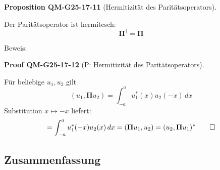 \documentclass[10pt, letterpaper]{article}
\newcommand{\CustomHeading}[3]{%
  \par\medskip\noindent%
  \textbf{#1 #2} \textnormal{(#3)}.\enskip%
}
\newenvironment{PROP}[2]{\begin{unitbox}\CustomHeading{Proposition}{#1}{#2}}{\end{unitbox}}
\newenvironment{PROOF}[2]{\begin{unitbox}\CustomHeading{Proof}{#1}{#2}}{\end{unitbox}}
\begin{document}
\begin{PROP}{QM-G25-17-11}{Hermitizität des Paritätsoperators}
Der Paritätsoperator ist hermitesch:
\[
\boldsymbol{\Pi}^\dagger = \boldsymbol{\Pi}
\]
\end{PROP}


Beweis: 

\begin{PROOF}{QM-G25-17-12}{P: Hermitizität des Paritätsoperators}
Für beliebige $u_1, u_2$ gilt
\[
(u_1, \boldsymbol{\Pi} u_2) = \int_{-a}^{a} u_1^*(x) u_2(-x)\, dx
\]
Substitution $x \mapsto -x$ liefert:
\[
= \int_{-a}^{a} u_1^*(-x) u_2(x)\, dx = (\boldsymbol{\Pi} u_1, u_2) = (u_2, \boldsymbol{\Pi} u_1)^*
\qed
\]
\end{PROOF}






\pagebreak



\subsection{Zusammenfassung}
\end{document}
